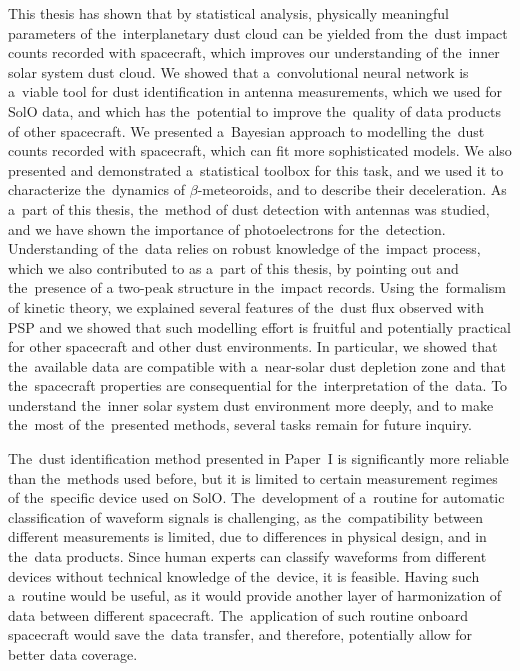 This thesis has shown that by statistical analysis, physically meaningful parameters of the~interplanetary dust cloud can be yielded from the~dust impact counts recorded with spacecraft, which improves our understanding of the~inner solar system dust cloud. We showed that a~convolutional neural network is a~viable tool for dust identification in antenna measurements, which we used for SolO data, and which has the~potential to improve the~quality of data products of other spacecraft. We presented a~Bayesian approach to modelling the~dust counts recorded with spacecraft, which can fit more sophisticated models. We also presented and demonstrated a~statistical toolbox for this task, and we used it to characterize the~dynamics of \mbox{$\beta$-meteoroids}, and to describe their deceleration. As a~part of this thesis, the~method of dust detection with antennas was studied, and we have shown the importance of photoelectrons for the~detection. Understanding of the~data relies on robust knowledge of the~impact process, which we also contributed to as a~part of this thesis, by pointing out and the~presence of a two-peak structure in the~impact records. Using the~formalism of kinetic theory, we explained several features of the~dust flux observed with PSP and we showed that such modelling effort is fruitful and potentially practical for other spacecraft and other dust environments. In particular, we showed that the~available data are compatible with a~near-solar dust depletion zone and that the~spacecraft properties are consequential for the~interpretation of the~data. To understand the~inner solar system dust environment more deeply, and to make the~most of the~presented methods, several tasks remain for future inquiry. 

The~dust identification method presented in Paper~I is significantly more reliable than the~methods used before, but it is limited to certain measurement regimes of the~specific device used on SolO. The~development of a~routine for automatic classification of waveform signals is challenging, as the~compatibility between different measurements is limited, due to differences in physical design, and in the~data products. Since human experts can classify waveforms from different devices without technical knowledge of the~device, it is feasible. Having such a~routine would be useful, as it would provide another layer of harmonization of data between different spacecraft. The~application of such routine onboard spacecraft would save the~data transfer, and therefore, potentially allow for better data coverage. 

